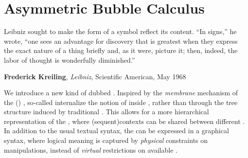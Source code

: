 \setchapterpreamble[u]{\margintoc}
\chapter{Asymmetric Bubble Calculus}

\epigraph{Leibniz sought to make the form of a symbol reflect its content. ``In
signs,'' he wrote, ``one sees an advantage for discovery that is greatest when
they express the exact nature of a thing briefly and, as it were, picture it;
then, indeed, the labor of thought is wonderfully diminished.''}
{\textbf{Frederick Kreiling}, \textit{Leibniz}, Scientific American, May 1968}


\begin{scope}


We introduce a new kind of   dubbed
. Inspired by the \emph{membrane} mechanism of the
 (\reintro{\cham})
, so-called  internalize the
notion of  inside , rather than through the tree
structure induced by traditional . This allows for a more
hierarchical representation of the , where
\kl(sequent){contexts} can be shared between different . In
addition to the usual textual syntax, the  can be expressed
in a graphical syntax, where logical meaning is captured by \emph{physical}
constraints on  manipulations, instead of \emph{virtual}
restrictions on available .



\end{scope}
